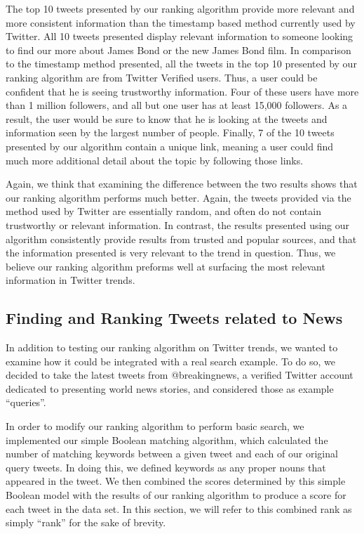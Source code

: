 \documentclass[10pt]{proc}
\begin{document}
    The top 10 tweets presented by our ranking algorithm provide more relevant and more consistent information than the timestamp based method currently used by Twitter. All 10 tweets presented display relevant information to someone looking to find our more about James Bond or the new James Bond film. In comparison to the timestamp method presented, all the tweets in the top 10 presented by our ranking algorithm are from Twitter Verified users. Thus, a user could be confident that he is seeing trustworthy information. Four of these users have more than 1 million followers, and all but one user has at least 15,000 followers. As a result, the user would be sure to know that he is looking at the tweets and information seen by the largest number of people. Finally, 7 of the 10 tweets presented by our algorithm contain a unique link, meaning a user could find much more additional detail about the topic by following those links.
    
    Again, we think that examining the difference between the two results shows that our ranking algorithm performs much better. Again, the tweets provided via the method used by Twitter are essentially random, and often do not contain trustworthy or relevant information. In contrast, the results presented using our algorithm consistently provide results from trusted and popular sources, and that the information presented is very relevant to the trend in question. Thus, we believe our ranking algorithm preforms well at surfacing the most relevant information in Twitter trends.

  \subsection{Finding and Ranking Tweets related to News}
  In addition to testing our ranking algorithm on Twitter trends, we wanted to examine how it could be integrated with a real search example. To do so, we decided to take the latest tweets from @breakingnews, a verified Twitter account dedicated to presenting world news stories, and considered those as example ``queries''.

  In order to modify our ranking algorithm to perform basic search, we implemented our simple Boolean matching algorithm, which calculated the number of matching keywords between a given tweet and each of our original query tweets. In doing this, we defined keywords as any proper nouns that appeared in the tweet. We then combined the scores determined by this simple Boolean model with the results of our ranking algorithm to produce a score for each tweet in the data set. In this section, we will refer to this combined rank as simply ``rank'' for the sake of brevity.
\end{document}
